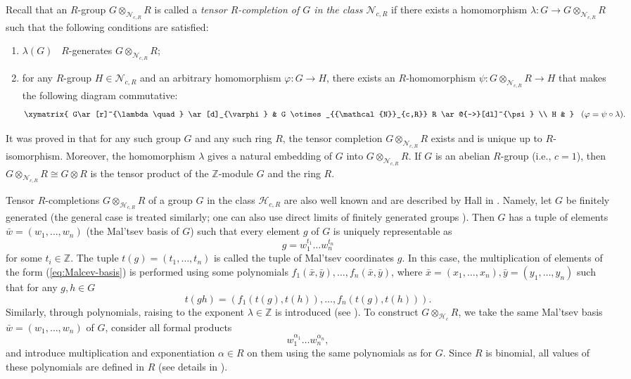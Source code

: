 \documentclass[11pt]{article}
\def\Z{{\mathbb Z}}
\def\N{{\mathbb N}}
\def\N{{\mathcal{N}}}
\theoremstyle{definition}
\begin{document}
Recall that an $R$-group $G \otimes_{\N_{c,R} }R$ is called a \emph{tensor $R$-completion of $G$ in the class $\N_{c,R}$} if there exists a homomorphism $\lambda:G\to G \otimes_{\N_{c,R} }R$ such that the following conditions are satisfied:

\begin{enumerate}
\item[{\rm (1)}] $\lambda(G)$ \ $R$-generates $G \otimes_{\N_{c,R}}R$;

\item[{\rm (2)}] for any $R$-group $H \in \N_{c,R}$ and an arbitrary homomorphism $\varphi:G\to H$, there exists an $R$-homomorphism $\psi: G \otimes_{\N_{c,R}} R\to H$ that makes the following diagram commutative:
$$ \begin{matrix}
\xymatrix{
G\ar[r]^{\lambda\quad} \ar[d]_{\varphi} & G \otimes_{\N_{c,R}} R \ar@{-->}[dl]^{\psi} \\
H & }\end{matrix} \;\;\; (\varphi=\psi\circ \lambda). $$
\end{enumerate}

It was proved in \cite{AMN} that for any such group $G$ and any such ring $R$, the tensor completion $G \otimes_{\N_{c,R}}R$ exists and is unique up to $R$-isomorphism. Moreover, the homomorphism $\lambda$ gives a natural embedding of $G$ into $G \otimes_{\N_{c,R}}R$. If $G$ is an abelian $R$-group (i.e., $c= 1$), then $G \otimes_{\N_{c,R}}R\cong G\otimes {R}$ is the tensor product of the $\Z$-module $G$ and the ring $R$.

Tensor $R$-completions $G \otimes_{\mathcal{H}_{c,R}} R$ of a group $G$ in the class $\mathcal{H}_{c,R}$ are also well known and are described by Hall in \cite{12}. Namely, let $G$ be finitely generated (the general case is treated similarly; one can also use direct limits of finitely generated groups \cite{2}). Then $G$ has a tuple of elements $\bar w = (w_1, \ldots, w_n)$ (the Mal'tsev basis of $G$) such that every element $g$ of $G$ is uniquely representable as
\begin{equation} \label{eq:Malcev-basis}
g= w_1^{t_1} \ldots w_n^{t_n}
\end{equation}
for some $t_i \in \Z$. The tuple $t(g) = (t_1, \ldots,t_n)$ is called the tuple of Mal'tsev coordinates $g$. In this case, the multiplication of elements of the form (\ref{eq:Malcev-basis}) is performed using some polynomials $f_1(\bar x, \bar y), \ldots, f_n(\bar x,\bar y)$, where $\bar x = (x_1, \ldots,x_n), \bar y = (y_1, \ldots,y_n)$ such that for any $g, h \in G$
$$
t(gh) = (f_1(t(g),t(h)), \ldots, f_n(t(g),t(h))).
$$
Similarly, through polynomials, raising to the exponent $\lambda \in \Z$ is introduced (see \cite{12}).
To construct $G \otimes_{\mathcal{H}_{c}} R$, we take the same Mal'tsev basis
$\bar w = (w_1, \ldots, w_n)$ of $G$, consider all formal products
$$
w_1^{\alpha_1} \ldots w_n^{\alpha_n},
$$
and introduce multiplication and exponentiation $\alpha \in R$ on them using the same polynomials as for $G$. Since $R$ is binomial, all values of these polynomials are defined in $R$ (see details in \cite{W}).
\end{document}
